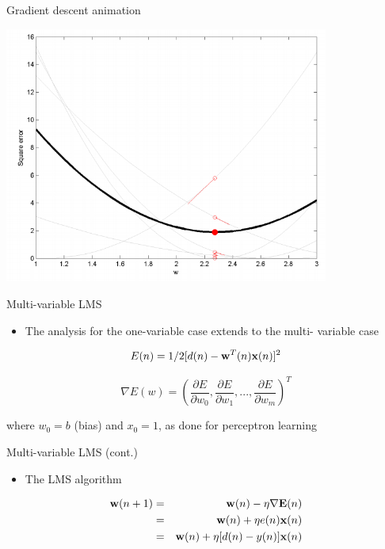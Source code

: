\documentclass[notes]{beamer}
\providecommand{\tightlist}{%
  \setlength{\itemsep}{0pt}\setlength{\parskip}{0pt}}
\begin{document}
\begin{frame}{Gradient descent animation}

\centering 

\includegraphics[width=0.80000\textwidth]{2018-03-10-10-01-33.png}\\

\end{frame}

\begin{frame}{Multi-variable LMS}

\begin{itemize}
\tightlist
\item
  The analysis for the one-variable case extends to the multi- variable
  case
\end{itemize}

\[ E ( n ) = 1/2 [d ( n ) - \mathbf{w}^ T ( n )\mathbf{x}( n )]^2 \]

\[  \nabla  E( w ) = \left(  \frac{\partial E}{\partial w_0}  ,  \frac{\partial E}{\partial w_1}  ,...,   \frac{\partial E}{\partial w_m} \right)^T \]

where \(w_0= b\) (bias) and \(x_0 = 1\), as done for perceptron learning

\end{frame}

\begin{frame}{Multi-variable LMS (cont.)}

\begin{itemize}
\tightlist
\item
  The LMS algorithm
\end{itemize}

\begin{eqnarray*}
    \mathbf{w} ( n + 1)& =& \mathbf{w} ( n )-\eta \nabla  \mathbf{E}( n ) \\ 
    &= &\mathbf{w} ( n ) + \eta e( n )\mathbf{x}( n )\\
    &= &\mathbf{w} ( n ) + \eta [d ( n ) - y ( n )]\mathbf{x}( n ) 
\end{eqnarray*}

\end{frame}
\end{document}

